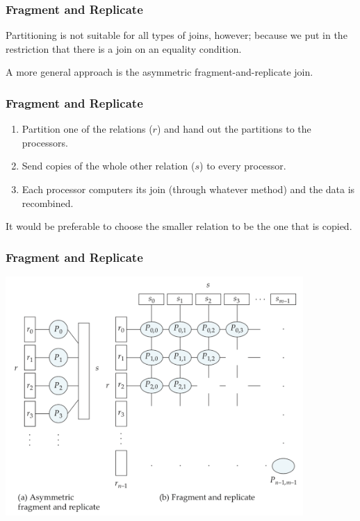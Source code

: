 \begin{frame}
\frametitle{Fragment and Replicate}

Partitioning is not suitable for all types of joins, however; because we put in the restriction that there is a join on an equality condition. 

A more general approach is the \alert{asymmetric fragment-and-replicate join}.

\end{frame}

\begin{frame}
\frametitle{Fragment and Replicate}

\begin{enumerate}
\item Partition one of the relations ($r$) and hand out the partitions to the processors.
\item Send copies of the whole other relation ($s$) to every processor.
\item Each processor computers its join (through whatever method) and the data is recombined. 
\end{enumerate}

It would be preferable to choose the smaller relation to be the one that is copied.

\end{frame}

\begin{frame}
\frametitle{Fragment and Replicate}

\begin{center}
\includegraphics[width=0.85\textwidth]{images/fragment-and-replicate}
\end{center}

\end{frame}

